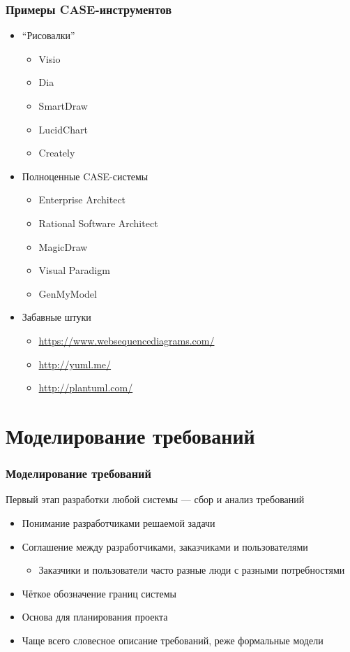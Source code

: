 \documentclass[xetex,mathserif,serif]{beamer}
\begin{document}
	\begin{frame}
		\frametitle{Примеры CASE-инструментов}
		\begin{itemize}
			\item ``Рисовалки''
			\begin{itemize}
				\item Visio
				\item Dia
				\item SmartDraw
				\item LucidChart
				\item Creately
			\end{itemize}
			\item Полноценные CASE-системы
			\begin{itemize}
				\item Enterprise Architect
				\item Rational Software Architect
				\item MagicDraw
				\item Visual Paradigm
				\item GenMyModel
			\end{itemize}
			\item Забавные штуки
			\begin{itemize}
				\item \url{https://www.websequencediagrams.com/}
				\item \url{http://yuml.me/}
				\item \url{http://plantuml.com/}
			\end{itemize}
		\end{itemize}
	\end{frame}

	\section{Моделирование требований}

	\begin{frame}
		\frametitle{Моделирование требований}
		Первый этап разработки любой системы --- сбор и анализ требований
		\begin{itemize}
			\item Понимание разработчиками решаемой задачи
			\item Соглашение между разработчиками, заказчиками и пользователями
			\begin{itemize}
				\item Заказчики и пользователи часто разные люди с разными потребностями
			\end{itemize}
			\item Чёткое обозначение границ системы
			\item Основа для планирования проекта
			\item Чаще всего словесное описание требований, реже формальные модели
		\end{itemize}
	\end{frame}
\end{document}
